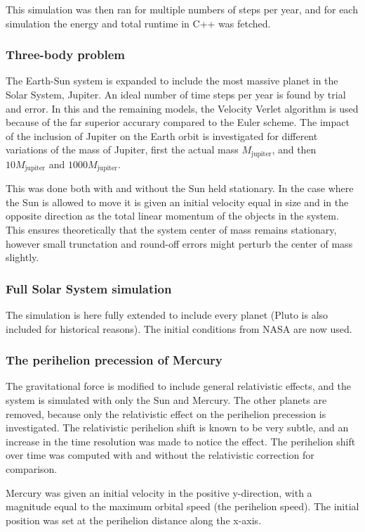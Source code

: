 \documentclass[aps,reprint]{revtex4-1}
\begin{document}
This simulation was then ran for multiple numbers of steps per year, and for
each simulation the energy and total runtime in C++ was fetched.
\subsubsection{Three-body problem}
The Earth-Sun system is expanded to include the most massive planet in the Solar System, Jupiter.
An ideal number of time steps per year is found by trial and error. In this and the remaining models, the Velocity
Verlet algorithm is used because of the far superior accurary compared to the
Euler scheme. The impact of the inclusion of Jupiter on the Earth orbit is investigated
for different variations of the mass of Jupiter, first the actual mass $M_\text{jupiter}$,
and then $10 M_\text{jupiter}$ and $1000 M_\text{jupiter}$.

This was done both with and without the Sun held stationary. In the case where
the Sun is allowed to move it is given an initial velocity equal in size and
in the opposite direction as the total linear momentum of the objects in the system.
This ensures theoretically that the system center of mass remains stationary, however
small trunctation and round-off errors might perturb the center of mass slightly.
\subsubsection{Full Solar System simulation}
The simulation is here fully extended to include every planet (Pluto is also included
for historical reasons). The initial conditions from NASA are now used.
\subsubsection{The perihelion precession of Mercury}
The gravitational force is modified to include general relativistic effects, and
the system is simulated with only the Sun and Mercury. The other planets are removed,
because only the relativistic effect on the perihelion precession is investigated.
The relativistic perihelion shift is known to be very subtle, and an increase in the time resolution
was made to notice the effect. The perihelion shift over time was computed with
and without the relativistic correction for comparison.

Mercury was given an initial velocity in the positive y-direction, with a
magnitude equal to the maximum orbital speed (the perihelion speed). The initial
position was set at the perihelion distance along the x-axis.
\end{document}
